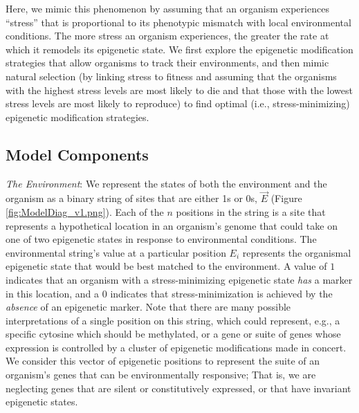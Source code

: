 \documentclass{article}
\begin{document}
Here, we mimic this phenomenon by assuming that an organism experiences ``stress'' that is proportional to its phenotypic mismatch with local environmental conditions. The more stress an organism experiences, the greater the rate at which it remodels its epigenetic state. We first explore the epigenetic modification strategies that allow organisms to track their environments, and then mimic natural selection (by linking stress to fitness and assuming that the organisms with the highest stress levels are most likely to die and that those with the lowest stress levels are most likely to reproduce) to find optimal (i.e., stress-minimizing) epigenetic modification strategies.

\subsection{Model Components}


\noindent \textit{The Environment}: We represent the states of both the environment and the organism as a binary string of sites that are either 1s or 0s, $\vec{E}$ (Figure \ref{fig:ModelDiag_v1.png}). Each of the $n$ positions in the string is a site that represents a hypothetical location in an organism's genome that could take on one of two epigenetic states in response to environmental conditions. The environmental string's value at a particular position $E_i$ represents the organismal epigenetic state that would be best matched to the environment. %
A value of $1$ indicates that an organism with a stress-minimizing epigenetic state \textit{has} a marker in this location, and a $0$ indicates that stress-minimization is achieved by the \textit{absence} of an epigenetic marker. Note that there are many possible interpretations of a single position on this string, which could represent, e.g., a specific cytosine which should be methylated, or a gene or suite of genes whose expression is controlled by a cluster of epigenetic modifications made in concert. 
We consider this vector of epigenetic positions to represent the suite of an organism's genes that can be environmentally responsive; That is, we are neglecting genes that are silent or constitutively expressed, or that have invariant epigenetic states.
\end{document}

